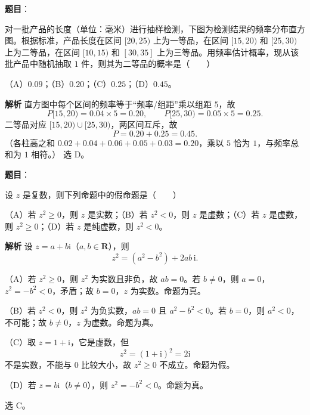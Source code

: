 \begin{answer}

\textbf{题目}：

对一批产品的长度（单位：毫米）进行抽样检测，下图为检测结果的频率分布直方图。根据标准，产品长度在区间 $[20,25)$ 上为一等品，在区间 $[15,20)$ 和 $[25,30)$ 上为二等品，在区间 $[10,15)$ 和 $[30,35]$ 上为三等品。用频率估计概率，现从该批产品中随机抽取 $1$ 件，则其为二等品的概率是\mbox{（　　）}
\nopagebreak[4]
\begin{center}\end{center}
\nopagebreak[4]
（A）$0.09$；（B）$0.20$；（C）$0.25$；（D）$0.45$。

\textbf{解析}
直方图中每个区间的频率等于“频率/组距”乘以组距 $5$，故
\nopagebreak[4]
\[P[15,20)=0.04\times5=0.20,\qquad P[25,30)=0.05\times5=0.25.\]
二等品对应 $[15,20)\cup[25,30)$，两区间互斥，故
\nopagebreak[4]
\[P=0.20+0.25=0.45.\]
（各柱高之和 $0.02+0.04+0.06+0.05+0.03=0.20$，乘以 $5$ 恰为 $1$，与频率总和为 $1$ 相符。）
选 D。

\gkanswer{答案：D。二等品区间为 $[15,20)$ 与 $[25,30)$，两组频率分别为 $0.04\times5=0.20$、$0.05\times5=0.25$，合计 $0.45$。}

\end{answer}
\begin{answer}

\textbf{题目}：

设 $z$ 是复数，则下列命题中的假命题是\mbox{（　　）}

（A）若 $z^2\geqslant0$，则 $z$ 是实数；（B）若 $z^2<0$，则 $z$ 是虚数；（C）若 $z$ 是虚数，则 $z^2\geqslant0$；（D）若 $z$ 是纯虚数，则 $z^2<0$。

\textbf{解析}
设 $z=a+b\mathrm i$（$a,b\in\mathbf R$），则
\nopagebreak[4]
\[z^2=(a^2-b^2)+2ab\,\mathrm i.\]

（A）若 $z^2\geqslant0$，则 $z^2$ 为实数且非负，故 $ab=0$。若 $b\neq0$，则 $a=0$，$z^2=-b^2<0$，矛盾；故 $b=0$，$z$ 为实数。命题为真。

（B）若 $z^2<0$，则 $z^2$ 为负实数，$ab=0$ 且 $a^2-b^2<0$。若 $b=0$，则 $a^2<0$，不可能；故 $b\neq0$，$z$ 为虚数。命题为真。

（C）取 $z=1+\mathrm i$，它是虚数，但
\nopagebreak[4]
\[z^2=(1+\mathrm i)^2=2\mathrm i\]
不是实数，不能与 $0$ 比较大小，故 $z^2\geqslant0$ 不成立。命题为假。

（D）若 $z=b\mathrm i$（$b\neq0$），则 $z^2=-b^2<0$。命题为真。

选 C。


\end{answer}
